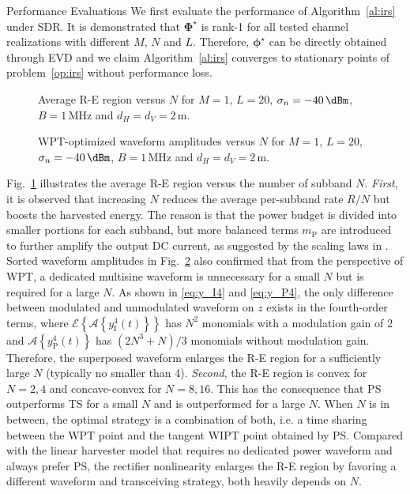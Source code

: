 \documentclass[journal]{IEEEtran}
\begin{document}
\begin{section}{Performance Evaluations}
		We first evaluate the performance of Algorithm~\ref{al:irs} under SDR. It is demonstrated that $\boldsymbol{\Phi}^{\star}$ is rank-\num{1} for all tested channel realizations with different $M$, $N$ and $L$. Therefore, $\boldsymbol{\phi}^{\star}$ can be directly obtained through EVD and we claim Algorithm~\ref{al:irs} converges to stationary points of problem~\eqref{op:irs} without performance loss.

		\begin{figure}[!t]
			\centering
			\begin{adjustbox}{width=\linewidth}
				
			\end{adjustbox}
			\caption{Average R-E region versus $N$ for $M=1$, $L=20$, $\sigma_n=-40\,\si{\dBm}$, $B=1\,\si{\MHz}$ and $d_H=d_V=2\,\si{\meter}$.}
			\label{fi:re_subband}
		\end{figure}

		\begin{figure}[!t]
			\centering
			\begin{adjustbox}{width=\linewidth}
				
			\end{adjustbox}
			\caption{WPT-optimized waveform amplitudes versus $N$ for $M=1$, $L=20$, $\sigma_n=-40\,\si{\dBm}$, $B=1\,\si{\MHz}$ and $d_H=d_V=2\,\si{\meter}$.}
			\label{fi:waveform_subband}
		\end{figure}

		Fig.~\ref{fi:re_subband} illustrates the average R-E region versus the number of subband $N$. \textit{First}, it is observed that increasing $N$ reduces the average per-subband rate $R/N$ but boosts the harvested energy. The reason is that the power budget is divided into smaller portions for each subband, but more balanced terms $m_\text{P}$ are introduced to further amplify the output DC current, as suggested by the scaling laws in \cite{Clerckx2018b}. Sorted waveform amplitudes in Fig.~\ref{fi:waveform_subband} also confirmed that from the perspective of WPT, a dedicated multisine waveform is unnecessary for a small $N$ but is required for a large $N$. As shown in \eqref{eq:y_I4} and \eqref{eq:y_P4}, the only difference between modulated and unmodulated waveform on $z$ exists in the fourth-order terms, where $\mathcal{E}\left\{\mathcal{A}\left\{y_{\text{I}}^4(t)\right\}\right\}$ has $N^2$ monomials with a modulation gain of \num{2} and $\mathcal{A}\left\{y_{\text{P}}^4(t)\right\}$ has $(2N^3+N)/3$ monomials without modulation gain. Therefore, the superposed waveform enlarges the R-E region for a sufficiently large $N$ (typically no smaller than 4). \textit{Second}, the R-E region is convex for $N = 2, 4$ and concave-convex for $N = 8, 16$. This has the consequence that PS outperforms TS for a small $N$ and is outperformed for a large $N$. When $N$ is in between, the optimal strategy is a combination of both, i.e. a time sharing between the WPT point and the tangent WIPT point obtained by PS. Compared with the linear harvester model that requires no dedicated power waveform and always prefer PS, the rectifier nonlinearity enlarges the R-E region by favoring a different waveform and transceiving strategy, both heavily depends on $N$.


\end{section}
\end{document}
